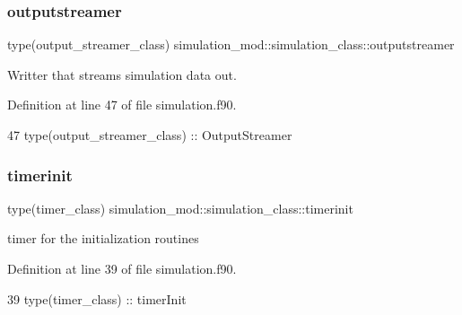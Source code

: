 \subsubsection{\texorpdfstring{outputstreamer}{outputstreamer}}
{\footnotesize\ttfamily type(output\+\_\+streamer\+\_\+class) simulation\+\_\+mod\+::simulation\+\_\+class\+::outputstreamer\hspace{0.3cm}{\ttfamily [private]}}



Writter that streams simulation data out. 



Definition at line 47 of file simulation.\+f90.


\begin{DoxyCode}
47         \textcolor{keywordtype}{type}(output\_streamer\_class) :: OutputStreamer
\end{DoxyCode}
\mbox{\label{structsimulation__mod_1_1simulation__class_ae5fe25a2db3a3e3c6896c13af90edb1c}} 
\subsubsection{\texorpdfstring{timerinit}{timerinit}}
{\footnotesize\ttfamily type(timer\+\_\+class) simulation\+\_\+mod\+::simulation\+\_\+class\+::timerinit\hspace{0.3cm}{\ttfamily [private]}}



timer for the initialization routines 



Definition at line 39 of file simulation.\+f90.


\begin{DoxyCode}
39         \textcolor{keywordtype}{type}(timer\_class) :: timerInit
\end{DoxyCode}
\mbox{\label{structsimulation__mod_1_1simulation__class_a05c525021082f10b6d452d9cf588c251}} 
